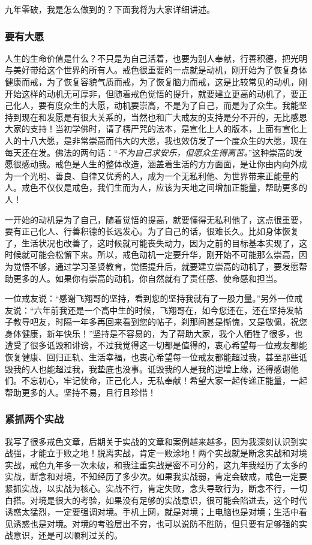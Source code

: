 九年零破，我是怎么做到的？下面我将为大家详细讲述。

\subsubsection{要有大愿}

人生的生命价值是什么？不只是为自己活着，也要为别人奉献，行善积德，把光明与美好带给这个世界的所有人。戒色很重要的一点就是动机，刚开始为了恢复身体健康而戒，为了恢复容貌气质而戒，为了恢复脑力而戒，这是比较常见的动机，刚开始这样的动机无可厚非，但随着戒色觉悟的提升，就要建立更高的动机了，要正己化人，要有度众生的大愿，动机要崇高，不是为了自己，而是为了众生。我能坚持到现在和发愿是有很大关系的，当然也和广大戒友的支持是分不开的，无比感恩大家的支持！当初学佛时，请了楞严咒的法本，是宣化上人的版本，上面有宣化上人的十八大愿，是非常崇高而伟大的大愿，我也效仿发了一个度众生的大愿，现在每天还在发。佛法的两句话：“\textit{不为自己求安乐，但愿众生得离苦。}”这种崇高的发愿很感动我。戒色是人生的整体改造，涵盖着生活的方方面面，是让你由内向外成为一个光明、善良、自律又优秀的人，成为一个无私利他、为世界带来正能量的人。戒色不仅仅是戒色，我们生而为人，应该为天地之间增加正能量，帮助更多的人！

一开始的动机是为了自己，随着觉悟的提高，就要懂得无私利他了，这点很重要，要有正己化人、行善积德的长远发心。为了自己的话，很难长久。比如身体恢复了，生活状况也改善了，这时候就可能丧失动力，因为之前的目标基本实现了，这时候就可能会松懈下来。所以，戒色动机一定要升华，刚开始不可能那么崇高，因为觉悟不够，通过学习圣贤教育，觉悟提升后，就要建立崇高的动机了，要发愿帮助更多的人。如果你有崇高的动机，你自然就有了责任感、使命感和担当。

一位戒友说：“感谢飞翔哥的坚持，看到您的坚持我就有了一股力量。”另外一位戒友说：“六年前我还是一个高中生的时候，飞翔哥在，如今您还在，还在坚持发帖子教导吧友，时隔一年多再回来看到您的帖子，刹那间甚是惭愧，又是敬佩，祝您身体健康，新年快乐！”坚持是不容易的，为了帮助大家，我个人牺牲了很多，也遭受了很多诋毁和诽谤，不过我觉得这一切都是值得的，衷心希望每一位戒友都能恢复健康、回归正轨、生活幸福，也衷心希望每一位戒友都能超过我，甚至那些诋毁我的人也能超过我，我垫底也没事。诋毁我的人是我的逆增上缘，还得感谢他们。不忘初心，牢记使命，正己化人，无私奉献！希望大家一起传递正能量，一起帮助更多的人。坚持不易，且行且珍惜！

\subsubsection{紧抓两个实战}

我写了很多戒色文章，后期关于实战的文章和案例越来越多，因为我深刻认识到实战强，才能立于败之地！脱离实战，肯定一败涂地！两个实战就是断念实战和对境实战，戒色九年多一次未破，和我注重实战是密不可分的，这九年我经历了太多的实战，断念和对境，不知经历了多少次。如果我实战弱，肯定会破戒，戒色一定要紧抓实战，以实战为核心。实战不行，肯定失败，念头导致行为，断念不行，一切白搭。对境是很大的考验，如果没有足够的实战意识，很可能会陷进去，这个时代诱惑太猛烈，一定要强调对境。手机上网，就是对境；上电脑也是对境；生活中看见诱惑也是对境。对境的考验层出不穷，也可以说防不胜防，但只要有足够强的实战意识，还是可以顺利过关的。

